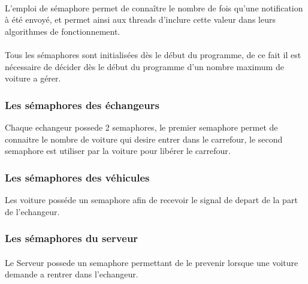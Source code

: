 \documentclass{report}
\begin{document}
	\paragraph{}
	L'emploi de sémaphore permet de connaître le nombre de fois qu'une notification à été envoyé, et permet ainsi aux threads d'inclure cette valeur dans leurs algorithmes de fonctionnement.
	\paragraph{}
	Tous les sémaphores sont initialisées dès le début du programme, de ce fait il est nécessaire de décider dès le début du programme d'un nombre maximum de voiture a gérer.
	
			\subsubsection{Les sémaphores des échangeurs}
			Chaque echangeur possede 2 semaphores, le premier semaphore permet de connaitre le nombre de voiture qui desire entrer dans le carrefour, le second semaphore est utiliser par la voiture pour libérer le carrefour.

			\subsubsection{Les sémaphores des véhicules}
			Les voiture posséde un semaphore afin de recevoir le signal de depart de la part de l'echangeur. 

			\subsubsection{Les sémaphores du serveur}
			\paragraph{}
			Le Serveur possede un semaphore permettant de le prevenir lorsque une voiture demande a rentrer dans l'echangeur.
		
		
	
\end{document}
